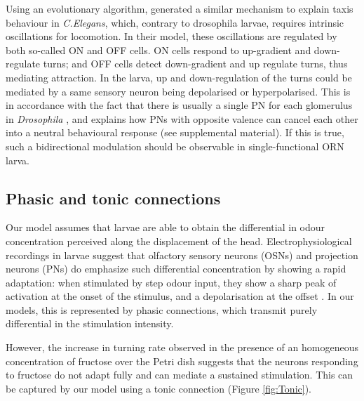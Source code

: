 \documentclass[11pt,a4paper]{article}
\newcommand{\Dros }{\emph{Drosophila }}
\newcommand{\todoAW}[1]{\todo[author=AW,color=green, size=\tiny,inline]{1}}
\begin{document}
Using an evolutionary algorithm, \cite{izquierdo2010evolution} generated a similar mechanism to explain taxis behaviour in {\it C.Elegans}, which, contrary to drosophila larvae, requires intrinsic oscillations for locomotion. In their model, these oscillations are regulated by both so-called ON and OFF cells. ON cells respond to up-gradient and down-regulate turns; and OFF cells detect down-gradient and up regulate turns, thus mediating attraction. In the larva, up and down-regulation of the turns could be mediated by a same sensory neuron being depolarised or hyperpolarised. This is in accordance with the fact that there is usually a single PN for each glomerulus in \Dros \citep{ramaekers2005glomerular} %
 , and explains how PNs with opposite valence can cancel each other into a neutral behavioural response (see supplemental material). If this is true, such a bidirectional modulation should be observable in single-functional ORN larva. 
  
\subsection{Phasic and tonic connections}
Our model assumes that larvae are able to obtain the differential in odour concentration perceived along the displacement of the head. Electrophysiological recordings in larvae suggest that olfactory sensory neurons (OSNs) \citep{nagel2011biophysical,schulze2015dynamical} and projection neurons (PNs) do emphasize such differential concentration by showing a rapid adaptation: when stimulated by step odour input, they show a sharp peak of activation at the onset of the stimulus, and a depolarisation at the offset \citep{schulze2015dynamical}. In our models, this is represented by phasic connections, which transmit purely differential in the stimulation intensity.  

However, the increase in turning rate observed in the presence of an homogeneous concentration of fructose over the Petri dish \cite{schleyer2015learning} suggests that the neurons responding to fructose do not adapt fully and can mediate a sustained stimulation. This can be captured by our model using a tonic connection (Figure \ref{fig:Tonic}).
\end{document}
